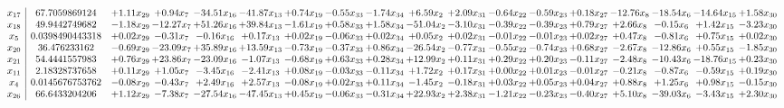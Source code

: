 \documentclass[9pt]{article}
\begin{document}
 \[\begin{array}{c| c c@{\hskip 2pt} c@{\hskip 2pt} c@{\hskip 2pt} c@{\hskip 2pt} c@{\hskip 2pt} c@{\hskip 2pt} c@{\hskip 2pt} c@{\hskip 2pt} c@{\hskip 2pt} c@{\hskip 2pt} c@{\hskip 2pt} c@{\hskip 2pt} c@{\hskip 2pt} c@{\hskip 2pt} c@{\hskip 2pt} c@{\hskip 2pt} }
 x_{17}   &  67.7059869124 & +  1.11 x_{29} & +  0.94 x_{7} & -34.51 x_{16} & -41.87 x_{13} & +  0.74 x_{19} & -0.55 x_{33} & -1.74 x_{34} & +  6.59 x_{2} & +  2.09 x_{31} & -0.64 x_{22} & -0.59 x_{23} & +  0.18 x_{27} & -12.76 x_{8} & -18.54 x_{6} & -14.64 x_{15} & +  1.58 x_{30}\\
 x_{18}   &  49.9442749682 & -1.18 x_{29} & -12.27 x_{7} & + 51.26 x_{16} & + 39.84 x_{13} & -1.61 x_{19} & +  0.58 x_{33} & +  1.58 x_{34} & -51.04 x_{2} & -3.10 x_{31} & -0.39 x_{22} & -0.39 x_{23} & +  0.79 x_{27} & +  2.66 x_{8} & -0.15 x_{6} & +  1.42 x_{15} & -3.23 x_{30}\\
 x_{5}   &  0.0398490443318 & +  0.02 x_{29} & -0.31 x_{7} & -0.16 x_{16} & +  0.17 x_{13} & +  0.02 x_{19} & -0.06 x_{33} & +  0.02 x_{34} & +  0.05 x_{2} & +  0.02 x_{31} & -0.01 x_{22} & -0.01 x_{23} & +  0.02 x_{27} & +  0.47 x_{8} & -0.81 x_{6} & +  0.75 x_{15} & +  0.02 x_{30}\\
 x_{20}   &  36.476233162 & -0.69 x_{29} & -23.09 x_{7} & + 35.89 x_{16} & + 13.59 x_{13} & -0.73 x_{19} & -0.37 x_{33} & +  0.86 x_{34} & -26.54 x_{2} & -0.77 x_{31} & -0.55 x_{22} & -0.74 x_{23} & +  0.68 x_{27} & -2.67 x_{8} & -12.86 x_{6} & +  0.55 x_{15} & -1.85 x_{30}\\
 x_{21}   &  54.4441557983 & +  0.76 x_{29} & + 23.86 x_{7} & -23.09 x_{16} & -1.07 x_{13} & -0.68 x_{19} & +  0.63 x_{33} & +  0.28 x_{34} & + 12.99 x_{2} & +  0.11 x_{31} & +  0.29 x_{22} & +  0.20 x_{23} & -0.11 x_{27} & -2.48 x_{8} & -10.43 x_{6} & -18.76 x_{15} & +  0.23 x_{30}\\
 x_{11}   &  2.18328737658 & +  0.11 x_{29} & +  1.05 x_{7} & -3.45 x_{16} & -2.41 x_{13} & +  0.08 x_{19} & -0.03 x_{33} & -0.11 x_{34} & +  1.72 x_{2} & +  0.17 x_{31} & +  0.00 x_{22} & +  0.01 x_{23} & -0.01 x_{27} & -0.21 x_{8} & -0.87 x_{6} & -0.59 x_{15} & +  0.19 x_{30}\\
 x_{4}   &  0.0145676753762 & -0.08 x_{29} & -0.43 x_{7} & +  2.49 x_{16} & +  2.57 x_{13} & -0.08 x_{19} & +  0.02 x_{33} & +  0.11 x_{34} & -1.45 x_{2} & -0.18 x_{31} & +  0.03 x_{22} & +  0.05 x_{23} & +  0.04 x_{27} & +  0.88 x_{8} & +  1.25 x_{6} & +  0.98 x_{15} & -0.15 x_{30}\\
 x_{26}   &  66.6433204206 & +  1.12 x_{29} & -7.38 x_{7} & -27.54 x_{16} & -47.45 x_{13} & +  0.45 x_{19} & -0.06 x_{33} & -0.31 x_{34} & + 22.93 x_{2} & +  2.38 x_{31} & -1.21 x_{22} & -0.23 x_{23} & -0.40 x_{27} & +  5.10 x_{8} & -39.03 x_{6} & -3.43 x_{15} & +  2.30 x_{30}\\

\end{array}\]
\end{document}
